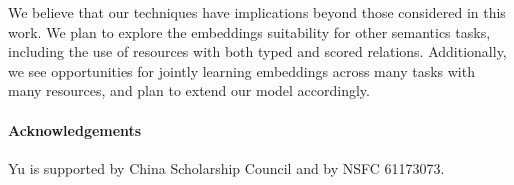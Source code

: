 \documentclass[11pt]{article}
\newcommand{\secref}[1]{Section~\ref{#1}}
\begin{document}
We believe that our techniques have implications beyond those considered in this work. We plan
to explore the embeddings suitability for other semantics tasks, including the use of resources
with both typed and scored relations. Additionally, we see opportunities for jointly learning embeddings across
many tasks with many resources, and plan to extend our model accordingly.

\iffalse
\begin{align*}
L = & \sum_{t\in \{1,2\}} \alpha_t \cdot \frac{1}{N_t} \sum_{i=1}^{N_t} \sum_{w \in \Omega_t(w_i) } \log p_t \left( w | w_i \right),
\end{align*}
where $\alpha_t$ is the weight of task $t$. $\Omega_t$ is the set of words to predict in task $t$. The probability $p_t$ is defined as:
\[
p_t(w_O|w_I) = \frac{\exp\left( { [e^{'0}_{w_O}:e^{'t}_{w_O} ]}^\top [e_{w_I}^0:e_{w_I}^t] \right)}{\sum_w \exp\left( { [e^{'0}_{w}:[e^{'t}_{w}] }^\top [e_{w_I}^0:e_{w_I}^t] \right)}.
\]
In this way each task $t$ only updates the task-specific embeddings $e^t$ and the shared embeddings $e^0$.

The method in \secref{ssec:train_joint} is a special case of the proposed multitask learning algorithm, with $e_w = e_w^0$.
\fi

\paragraph{Acknowledgements}
Yu is supported by China Scholarship Council and by
NSFC 61173073.



\end{document}
